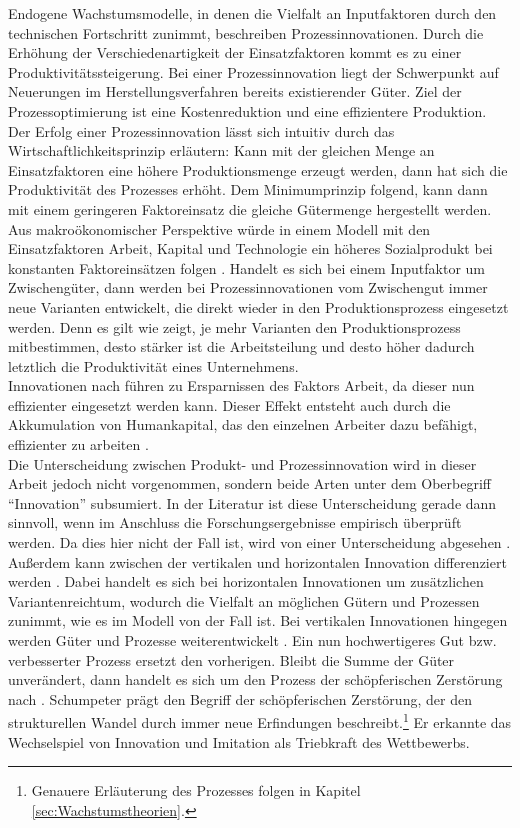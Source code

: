 Endogene Wachstumsmodelle, in denen die Vielfalt an Inputfaktoren durch den technischen Fortschritt zunimmt, beschreiben Prozessinnovationen. Durch die Erhöhung der Verschiedenartigkeit der Einsatzfaktoren kommt es zu einer Produktivitätssteigerung. Bei einer Prozessinnovation liegt der Schwerpunkt auf Neuerungen im Herstellungsverfahren bereits existierender Güter. Ziel der Prozessoptimierung ist eine Kostenreduktion und eine effizientere Produktion. Der Erfolg einer Prozessinnovation lässt sich intuitiv durch das Wirtschaftlichkeitsprinzip erläutern: Kann mit der gleichen Menge an Einsatzfaktoren eine höhere Produktionsmenge erzeugt werden, dann hat sich die Produktivität des Prozesses erhöht. Dem Minimumprinzip folgend, kann dann mit einem geringeren Faktoreinsatz die gleiche Gütermenge hergestellt werden. Aus makroökonomischer Perspektive würde in einem Modell mit den Einsatzfaktoren Arbeit, Kapital und Technologie ein höheres Sozialprodukt bei konstanten Faktoreinsätzen folgen \cite[Kapitel 10]{Frenkel.1999}. Handelt es sich bei einem Inputfaktor um Zwischengüter, dann werden bei Prozessinnovationen vom Zwischengut immer neue Varianten entwickelt, die direkt wieder in den Produktionsprozess eingesetzt werden. Denn es gilt wie \cite{Romer.1987,Romer.1990}  zeigt, je mehr Varianten den Produktionsprozess mitbestimmen, desto stärker ist die Arbeitsteilung und desto höher dadurch letztlich die Produktivität eines Unternehmens.\\
%
Innovationen nach \cite{Hicks.1932} führen zu Ersparnissen des Faktors Arbeit, da dieser nun effizienter eingesetzt werden kann. Dieser Effekt entsteht auch durch die Akkumulation von Humankapital, das den einzelnen Arbeiter dazu befähigt, effizienter zu arbeiten \cite[S.29]{Arrow.1969}.\\
%
Die Unterscheidung zwischen Produkt- und Prozessinnovation wird in dieser Arbeit jedoch nicht vorgenommen, sondern beide Arten unter dem Oberbegriff "`Innovation"' subsumiert. In der Literatur ist diese Unterscheidung gerade dann sinnvoll, wenn im Anschluss die Forschungsergebnisse empirisch überprüft werden. Da dies hier nicht der Fall ist, wird von einer Unterscheidung abgesehen \cite[Kapitel 12,S.411]{Acemoglu.2009}.\\
%
Außerdem kann zwischen der vertikalen und horizontalen Innovation differenziert werden \cite[S.20]{Grossman.1989a,vanLong.1997}. Dabei handelt es sich bei horizontalen Innovationen um zusätzlichen Variantenreichtum, wodurch die Vielfalt an möglichen Gütern und Prozessen zunimmt, wie es im Modell von \cite{Romer.1990} der Fall ist. Bei vertikalen Innovationen hingegen werden Güter und Prozesse weiterentwickelt \cite[S.20]{vanLong.1997}. Ein nun hochwertigeres Gut bzw. verbesserter Prozess ersetzt den vorherigen. Bleibt die Summe der Güter unverändert, dann handelt es sich um den Prozess der schöpferischen Zerstörung nach \cite{Schumpeter.1934}. Schumpeter prägt den Begriff der schöpferischen Zerstörung, der den strukturellen Wandel durch immer neue Erfindungen beschreibt.\footnote{Genauere Erläuterung des Prozesses folgen in Kapitel \ref{sec:Wachstumstheorien}.} Er erkannte das Wechselspiel von Innovation und Imitation als Triebkraft des Wettbewerbs.\\
